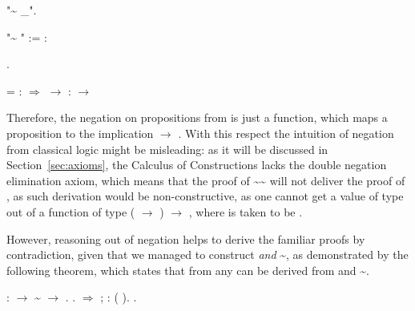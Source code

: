 \begin{coqdoccode}
\coqdocemptyline
\coqdocnoindent
{} "\~{} \_".\coqdoceol
\coqdocemptyline
\end{coqdoccode}


"\~{} " :=         : 
\begin{coqdoccode}
\coqdocemptyline
\coqdocnoindent
{} .\coqdoceol
\end{coqdoccode}


\coqdoceol
\coqdocemptyline
\coqdocindent{1.00em}
 =   :  \ensuremath{\Rightarrow}  \ensuremath{\rightarrow} \coqdoceol
\coqdocindent{3.50em}
:  \ensuremath{\rightarrow} 

\coqdocemptyline


Therefore, the negation  on propositions from  is just a
function, which maps a proposition  to the implication  \ensuremath{\rightarrow}
. With this respect the intuition of negation from classical
logic might be misleading: as it will be discussed in
Section~\ref{sec:axioms}, the Calculus of Constructions lacks the
double negation elimination axiom, which means that the proof of \textasciitilde \textasciitilde{} will not
deliver the proof of , as such derivation would be non-constructive,
as one cannot get a value of type  out of a function
of type ( \ensuremath{\rightarrow} ) \ensuremath{\rightarrow} , where  is taken to be .


However, reasoning out of negation helps to derive the familiar proofs
by contradiction, given that we managed to construct  \textit{and} \textasciitilde{},
as demonstrated by the following theorem, which states that from any
 can be derived from  and \textasciitilde{}. 


\begin{coqdoccode}
\coqdocemptyline
\coqdocnoindent
{} :  \ensuremath{\rightarrow} \textasciitilde{} \ensuremath{\rightarrow} .\coqdoceol
\coqdocnoindent
{}.  \ensuremath{\Rightarrow} ;  : ( ). .\coqdoceol
\coqdocemptyline
\end{coqdoccode}


